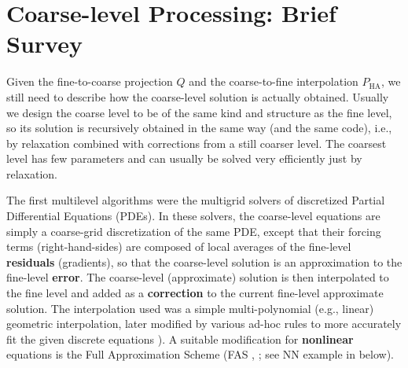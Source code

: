\documentclass{article} %
\begin{document}

\section{Coarse-level Processing: Brief Survey}
\label{sec:coarse_overview}
Given the fine-to-coarse projection $Q$ and the coarse-to-fine interpolation $P_{\text{HA}}$, we still need to describe how the coarse-level solution is actually obtained. Usually we design the coarse level to be of the same kind and structure as the fine level, so its solution is recursively obtained in the same way (and the same code), i.e., by relaxation combined with corrections from a still coarser level. The coarsest level has few parameters and can usually be solved very efficiently just by relaxation.

The first multilevel algorithms were the multigrid solvers of discretized Partial Differential Equations (PDEs). In these solvers, the coarse-level equations are simply a coarse-grid discretization of the same PDE, except that their forcing terms (right-hand-sides) are composed of local averages of the fine-level \textbf{residuals} (gradients), so that the coarse-level solution is an approximation to the fine-level \textbf{error}. The coarse-level (approximate) solution is then interpolated to the fine level and added as a \textbf{correction} to the current fine-level approximate solution. The interpolation used was a simple multi-polynomial (e.g., linear) geometric interpolation, later modified by various ad-hoc rules to more accurately fit the given discrete equations \cite{mg_discontinous}). A suitable modification for \textbf{nonlinear} equations is the Full Approximation Scheme (FAS \cite{brandt77}, \cite[Sec.~8]{guide}; see NN example in \cite{sec:9} below).
\end{document}
